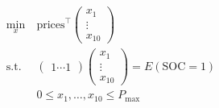 \documentclass[preview]{standalone}
\begin{document}
\begin{align*}
\begin{aligned}\min_{x} &\ \text{prices}^\top \begin{pmatrix} x_1\\ \vdots\\ x_10 \end{pmatrix} \\\text{s.t.} &\ \begin{pmatrix} 1 \cdots 1 \end{pmatrix} \begin{pmatrix} x_1\\ \vdots\\ x_10 \end{pmatrix} = E\left(\text{SOC}=1\right) \\&\ 0 \leq x_1, \ldots , x_10 \leq P_\text{max} \end{aligned}
\end{align*}
\end{document}
